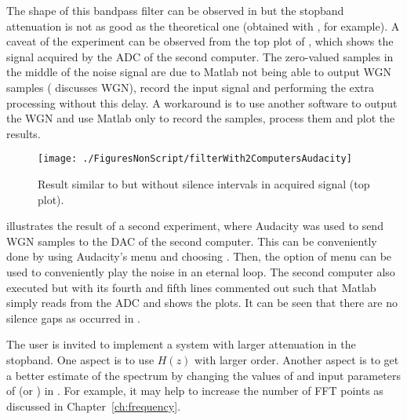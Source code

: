 The shape of this bandpass filter can be observed in  but the stopband attenuation is not as good as the theoretical one (obtained with , for example). A caveat of the experiment can be observed from the top plot of , which shows the signal acquired by the ADC of the second computer. The zero-valued samples in the middle of the noise signal are due to Matlab not being able to output WGN samples ( discusses WGN), record the input signal and performing the extra processing without this delay. A workaround is to use another software to output the WGN and use Matlab only to record the samples, process them and plot the results.

\begin{figure}
\centering
\texttt{[image: ./FiguresNonScript/filterWith2ComputersAudacity]}
\caption{Result similar to  but without silence intervals in acquired signal (top plot).\label{fig:filterWith2ComputersAudacity}}
\end{figure}

 illustrates the result of a second experiment, where Audacity was used to send WGN samples to the DAC of the second computer. This can be conveniently done by using Audacity's menu  and choosing . Then, the option  of menu  can be used to conveniently play the noise in an eternal loop. The second computer also executed  but with its fourth and fifth lines commented out such that Matlab simply reads from the ADC and shows the plots. It can be seen that there are no silence gaps as occurred in . 

The user is invited to implement a system with larger attenuation in the stopband. One aspect is to use $H(z)$ with larger order. Another aspect is to get a better estimate of the spectrum by changing the values of  and input parameters of  (or ) in . For example, it may help to increase the number of FFT points as discussed in Chapter~\ref{ch:frequency}.
\eApplication 

